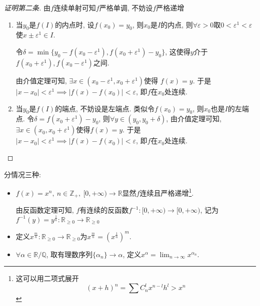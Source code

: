 \begin{proof}[证明第二条]
    由$f$连续单射可知$f$严格单调, 不妨设$f$严格递增
    \begin{enumerate}
        \item 当$y_0$是$f\left( I \right) $的内点时, 设$f\left( x_0 \right) = y_0$, 则$x_0$是$I$的内点, 则$\forall \varepsilon> 0 $取$0 < \varepsilon^{1} < \varepsilon$使$x \pm \varepsilon^{1} \in  I$.
        
        令$\delta = \min \{ y_0 - f\left( x_0 - \varepsilon^{1} \right) , f\left( x_0 + \varepsilon^{1} \right) - y_0 \}$, 这使得$y$介于$f\left( x_0 + \varepsilon^{1} \right) , f\left( x_0 - \varepsilon^{1} \right) $之间. 
        
        由介值定理可知, $\exists x \in \left( x_0 - \varepsilon^{1}, x_0 + \varepsilon ^{1} \right) $使得 $f\left( x \right)  = y$. 于是$\left| x - x_0 \right| < \varepsilon^{1} \implies \left| f\left( x \right) - f\left( x_0 \right)  \right| < \varepsilon$, 即$f$在$x_0$处连续.
        
        \item 当$y_0$是$f\left( I \right) $的端点, 不妨设是左端点. 类似令$f\left( x_0 \right) = y_0 $, 则$x_0$也是$I$的左端点. 令$\delta = f\left( x_0 + \varepsilon^{1} \right) - y_0$, 则$\forall y \in \left( y_0, y_0 + \delta \right) $, 由介值定理可知, $\exists x \in \left( x_0, x_0 + \varepsilon^{1} \right) $使得$f\left( x \right) = y$. 于是$\left| x - x_0 \right| < \varepsilon^{1} \implies \left| f\left( x \right) - f\left( x_0 \right)  \right| < \varepsilon$, 即$f$在$x_0$处连续.
    \end{enumerate}
\end{proof}

\begin{example}[幂函数]
    分情况三种:
    \begin{itemize}
        \item $f\left( x \right) = x^{n}, \ n \in \mathbb{Z}_{+}, \ [0,+\infty) \to  \mathbb{R}$显然$f$连续且严格递增\footnote{这可以用二项式展开
        \begin{equation}
          \left( x + h \right) ^{n} = \sum C_{n}^{l} x^{n - l} h^{l} > x^{n}
        \end{equation}}.

        由反函数定理可知, $f$有连续的反函数$f^{-1}\colon [0, +\infty) \to [0, +\infty)$, 记为$f^{-1} \left( y \right) = y^{\frac{1}{n}}\colon \mathbb{R}_{\ge 0} \to \mathbb{R}_{\ge 0}$

        \item 定义$x^{\frac{m}{n}}\colon \mathbb{R}_{\ge 0}\to \mathbb{R}_{\ge 0}$为$x^{\frac{m}{n}} = \left( x^{\frac{1}{n}} \right) ^{m}$.
        
        \item $\forall \alpha \in  \mathbb{R} / \mathbb{Q}$, 取有理数序列$\{ \alpha_{n} \} \to \alpha$, 定义$x^{\alpha} = \lim_{n \to \infty} x^{\alpha_{n}}$.
    \end{itemize}
\end{example}

